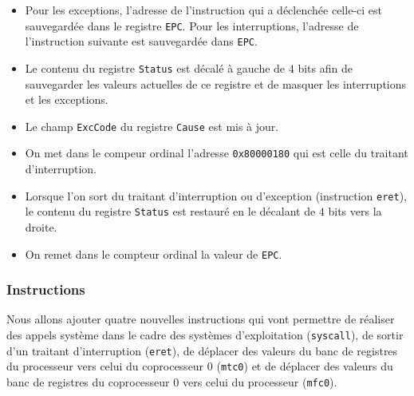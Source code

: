 \documentclass[12pt]{article}
\begin{document}
\begin{itemize}

\item Pour les exceptions, l'adresse de l'instruction qui a déclenchée
  celle-ci est sauvegardée dans le registre \verb+EPC+. Pour les interruptions,
  l'adresse de l'instruction suivante est sauvegardée dans \verb+EPC+.

\item Le contenu du registre \verb+Status+ est décalé à gauche de $4$ bits afin de sauvegarder
  les valeurs actuelles de ce registre et de masquer les interruptions et les exceptions.

\item Le champ \verb+ExcCode+ du registre \verb+Cause+ est mis à jour.

\item On met dans le compeur ordinal l'adresse \verb+0x80000180+ qui est celle du traitant d'interruption.

\item Lorsque l'on sort du traitant d'interruption ou d'exception (instruction \verb+eret+), le contenu du registre \verb+Status+
  est restauré en le décalant de $4$ bits vers la droite.

\item On remet dans le compteur ordinal la valeur de \verb+EPC+.

\end{itemize}

\subsubsection{Instructions}

Nous allons ajouter quatre nouvelles instructions qui vont permettre de réaliser des appels système dans le cadre des systèmes d'exploitation (\verb+syscall+),
de sortir d'un traitant d'interruption (\verb+eret+), de déplacer des valeurs du banc de registres du processeur vers celui du coprocesseur $0$ (\verb+mtc0+)
et de déplacer des valeurs du banc de registres du coprocesseur $0$ vers celui du processeur (\verb+mfc0+).\\
\end{document}
